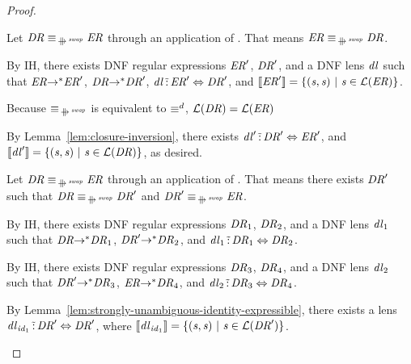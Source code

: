 \documentclass[numbers,10pt,preprint\ifanon ,nocopyrightspace\fi]{sigplanconf}
\begin{document}
\begin{proof}
  \begin{case}[\SymmetryRule]
    Let $\DNFRegex \EquivalenceOf{\ParallelRewriteSwap} \DNFRegexAlt$ through an
    application of \SymmetryRule{}.
    That means $\DNFRegexAlt \EquivalenceOf{\ParallelRewriteSwap} \DNFRegex$.

    By IH, there exists DNF regular expressions $\mathit{ER}'$, $\mathit{DR}'$,
    and a DNF lens $\mathit{dl}$ such that
    $\mathit{ER} {\rightarrow}^* \mathit{ER}'$,
    $\mathit{DR} {\rightarrow}^* \mathit{DR}'$,
    $\mathit{dl} \,\tilde{:}\, \mathit{ER}' \Leftrightarrow \mathit{DR}'$,
    and $[ \! [\mathit{ER}'] \! ] = \{(\mathit{s},\mathit{s}) ~|~
      \mathit{s} \in \mathcal{L}(\mathit{ER})\}$.

    Because $\EquivalenceOf{\ParallelRewriteSwap}$ is equivalent to
    $\equiv^d$, $\mathcal{L}(\mathit{DR}) = \mathcal{L}(\mathit{ER})$

    By Lemma~\ref{lem:closure-inversion}, there exists
    $\mathit{dl}' \,\tilde{:}\, \mathit{DR}' \Leftrightarrow \mathit{ER}'$,
    and $[ \! [\mathit{dl}'] \! ] = \{(\mathit{s},\mathit{s}) ~|~
      \mathit{s} \in \mathcal{L}(\mathit{DR})\}$, as desired.
  \end{case}

  \begin{case}[\TransitivityRule{}]
    Let $\DNFRegex \EquivalenceOf{\ParallelRewriteSwap} \DNFRegexAlt$ through an
    application of \TransitivityRule{}.
    That means there exists $\mathit{DR}'$ such that
    $\DNFRegex \EquivalenceOf{\ParallelRewriteSwap} \DNFRegex'$ and
    $\DNFRegex' \EquivalenceOf{\ParallelRewriteSwap} \DNFRegexAlt$.

    By IH, there exists DNF regular expressions $\mathit{DR}_1$, $\mathit{DR}_2$,
    and a DNF lens $\mathit{dl}_1$ such that
    $\mathit{DR} {\rightarrow}^* \mathit{DR}_1$,
    $\mathit{DR}' {\rightarrow}^* \mathit{DR}_2$,
    and $\mathit{dl}_1 \,\tilde{:}\, \mathit{DR}_1 \Leftrightarrow \mathit{DR}_2$.

    By IH, there exists DNF regular expressions $\mathit{DR}_3$, $\mathit{DR}_4$,
    and a DNF lens $\mathit{dl}_2$ such that
    $\mathit{DR}' {\rightarrow}^* \mathit{DR}_3$,
    $\mathit{ER} {\rightarrow}^* \mathit{DR}_4$,
    and $\mathit{dl}_2 \,\tilde{:}\, \mathit{DR}_3 \Leftrightarrow \mathit{DR}_4$.

    By Lemma~\ref{lem:strongly-unambiguous-identity-expressible}, there exists a
    lens $\mathit{dl}_{\mathit{id}_1} \,\tilde{:}\,
    \mathit{DR}' \Leftrightarrow \mathit{DR}'$, where
    $[ \! [\mathit{dl}_{\mathit{id}_1}] \! ] = \{(\mathit{s},\mathit{s}) ~|~
      \mathit{s} \in \mathcal{L}(\mathit{DR}')\}$.
    

\end{case}
\end{proof}
\end{document}
